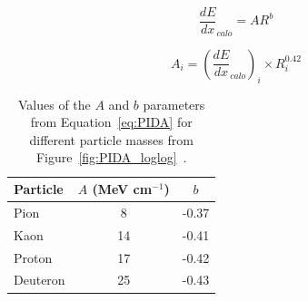 \begin{equation}
  \label{eq:PIDA}
  \frac{dE}{dx}_{calo} = A R^b
\end{equation}

\begin{equation}
  \label{eq:PIDA_A}
  A_i = (\frac{dE}{dx}_{calo})_i \times R^{0.42}_i
\end{equation}

\begin{table}
\caption{Values of the $A$ and $b$ parameters from Equation~\ref{eq:PIDA} for different particle masses from Figure~\ref{fig:PIDA_loglog}~\citep{PIDA_Paper}.}
\centering
\label{tab:PIDAVals}
\begin{tabular}{l c c}
\toprule
Particle & $A$ (MeV cm$^{-1}$) & $b$ \\ 
\hline
Pion     & 8  & -0.37 \\
Kaon     & 14 & -0.41 \\
Proton   & 17 & -0.42 \\
Deuteron & 25 & -0.43 \\
\bottomrule
\end{tabular}
\end{table}
